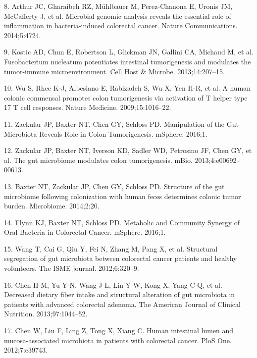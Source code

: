 \documentclass[12pt,]{article}
\begin{document}
\hypertarget{ref-arthur_microbial_2014}{}
8. Arthur JC, Gharaibeh RZ, Mühlbauer M, Perez-Chanona E, Uronis JM,
McCafferty J, et al. Microbial genomic analysis reveals the essential
role of inflammation in bacteria-induced colorectal cancer. Nature
Communications. 2014;5:4724.

\hypertarget{ref-kostic_fusobacterium_2013}{}
9. Kostic AD, Chun E, Robertson L, Glickman JN, Gallini CA, Michaud M,
et al. Fusobacterium nucleatum potentiates intestinal tumorigenesis and
modulates the tumor-immune microenvironment. Cell Host \& Microbe.
2013;14:207--15.

\hypertarget{ref-wu_human_2009}{}
10. Wu S, Rhee K-J, Albesiano E, Rabizadeh S, Wu X, Yen H-R, et al. A
human colonic commensal promotes colon tumorigenesis via activation of T
helper type 17 T cell responses. Nature Medicine. 2009;15:1016--22.

\hypertarget{ref-zackular_manipulation_2016}{}
11. Zackular JP, Baxter NT, Chen GY, Schloss PD. Manipulation of the Gut
Microbiota Reveals Role in Colon Tumorigenesis. mSphere. 2016;1.

\hypertarget{ref-zackular_gut_2013}{}
12. Zackular JP, Baxter NT, Iverson KD, Sadler WD, Petrosino JF, Chen
GY, et al. The gut microbiome modulates colon tumorigenesis. mBio.
2013;4:e00692--00613.

\hypertarget{ref-baxter_structure_2014}{}
13. Baxter NT, Zackular JP, Chen GY, Schloss PD. Structure of the gut
microbiome following colonization with human feces determines colonic
tumor burden. Microbiome. 2014;2:20.

\hypertarget{ref-flynn_metabolic_2016}{}
14. Flynn KJ, Baxter NT, Schloss PD. Metabolic and Community Synergy of
Oral Bacteria in Colorectal Cancer. mSphere. 2016;1.

\hypertarget{ref-wang_structural_2012}{}
15. Wang T, Cai G, Qiu Y, Fei N, Zhang M, Pang X, et al. Structural
segregation of gut microbiota between colorectal cancer patients and
healthy volunteers. The ISME journal. 2012;6:320--9.

\hypertarget{ref-chen_decreased_2013}{}
16. Chen H-M, Yu Y-N, Wang J-L, Lin Y-W, Kong X, Yang C-Q, et al.
Decreased dietary fiber intake and structural alteration of gut
microbiota in patients with advanced colorectal adenoma. The American
Journal of Clinical Nutrition. 2013;97:1044--52.

\hypertarget{ref-chen_human_2012}{}
17. Chen W, Liu F, Ling Z, Tong X, Xiang C. Human intestinal lumen and
mucosa-associated microbiota in patients with colorectal cancer. PloS
One. 2012;7:e39743.
\end{document}
